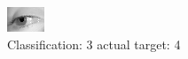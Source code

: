 \begin{figure}[h!]
\begin{center}
\includegraphics[width=0.60\columnwidth]{figures/ID2885_class_3_target_4.png}
\end{center}
\caption{ Classification: 3 actual target: 4}
\label{fig:ID2885_class_3_target_4}
\end{figure}

